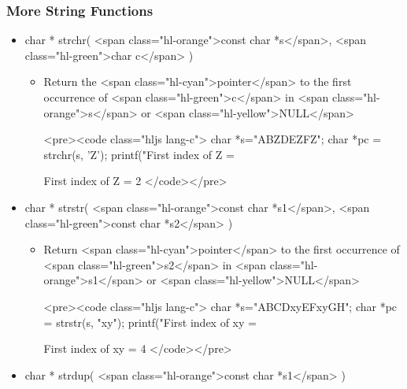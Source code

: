 \documentclass{../c-lecture}
\begin{document}
\begin{frame}
  \begin{frame}
    \frametitle{More String Functions}
  \end{frame}
  \begin{frame}
    \begin{itemize}
      \item
        char * strchr( <span class="hl-orange">const char *s</span>,
        <span class="hl-green">char c</span>
        )

      \begin{itemize}
        \item
          Return the <span class="hl-cyan">pointer</span> to the first
          occurrence of <span class="hl-green">c</span> in
          <span class="hl-orange">s</span> or
          <span class="hl-yellow">NULL</span>

        <pre><code class="hljs lang-c">
char *s="ABZDEZFZ";
char *pc = strchr(s, 'Z');
printf("First index of Z = %

First index of Z = 2
        </code></pre>
      \end{itemize}
    \end{itemize}
  \end{frame}
  \begin{frame}
    \begin{itemize}
      \item
        char * strstr( <span class="hl-orange">const char *s1</span>,
        <span class="hl-green">const char *s2</span>
        )

      \begin{itemize}
        \item
          Return <span class="hl-cyan">pointer</span> to the first occurrence of
          <span class="hl-green">s2</span> in
          <span class="hl-orange">s1</span> or
          <span class="hl-yellow">NULL</span>

        <pre><code class="hljs lang-c">
char *s="ABCDxyEFxyGH";
char *pc = strstr(s, "xy");
printf("First index of xy = %

First index of xy = 4
        </code></pre>
      \end{itemize}
    \end{itemize}
  \end{frame}
  \begin{frame}
    \begin{itemize}
      \item
        char * strdup(
        <span class="hl-orange">const char *s1</span>
        )


\end{itemize}
\end{frame}
\end{frame}
\end{document}
